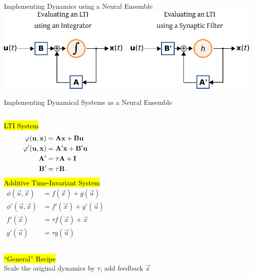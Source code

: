 \documentclass[handout,aspectratio=169]{beamer}
\begin{document}
	\begin{frame}{Implementing Dynamics using a Neural Ensemble}
		\centering
		\includegraphics[width=\textwidth]{media/lti_integrator_vs_neural.pdf} 
	\end{frame}

	\begin{frame}{Implementing Dynamical Systems as a Neural Ensemble}
		\begin{columns}[t]
			\centering
			\hl{LTI System}
			\begin{align*}
				\varphi({\mathbf{u}}, {\mathbf{x}}) &= {\mathbf{A}} {\mathbf{x}} + {\mathbf{B}} {\mathbf{u}} \\
				\varphi'({\mathbf{u}}, {\mathbf{x}}) &= {\mathbf{A}}' {\mathbf{x}} + {\mathbf{B}}' {\mathbf{u}} \\
				{\mathbf{A}}' &= \tau {\mathbf{A}} + {\mathbf{I}} \\ {\mathbf{B}}' &= \tau {\mathbf{B}} \,.
			\end{align*}
			\centering
			\hl{Additive Time-Invariant System}
			\begin{align*}
				\phi(\vec u, \vec x) &= f(\vec x) + g(\vec u) \\
				\phi'(\vec u, \vec x) &= f'(\vec x) + g'(\vec u) \\
				f'(\vec x) &= \tau f(\vec x) + \vec x \\
				g'(\vec u) &= \tau g(\vec u)
			\end{align*}
		\end{columns}
		\vspace{1cm}
		\centering \hl{\enquote{General} Recipe}\\[0.25cm]
		Scale the original dynamics by $\tau$, add feedback $\vec x$
	\end{frame}
\end{document}
